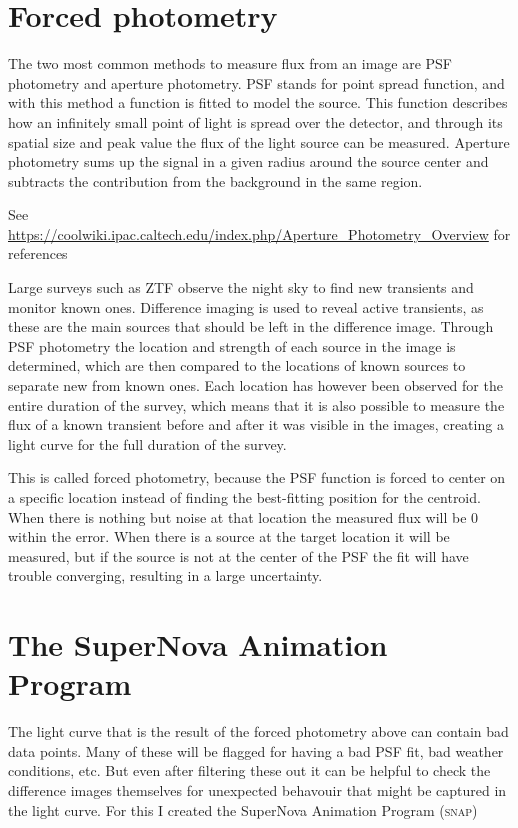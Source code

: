 \documentclass[a4paper,oneside,12pt, class=Latex/Classes/PhDthesisPSnPDF, crop=false]{standalone}
\begin{document}
\section{Forced photometry}
The two most common methods to measure flux from an image are PSF photometry and aperture photometry. PSF stands for point spread function, and with this method a function is fitted to model the source. This function describes how an infinitely small point of light is spread over the detector, and through its spatial size and peak value the flux of the light source can be measured. Aperture photometry sums up the signal in a given radius around the source center and subtracts the contribution from the background in the same region.

\color{red} See \url{https://coolwiki.ipac.caltech.edu/index.php/Aperture_Photometry_Overview} for references \color{black}

Large surveys such as ZTF observe the night sky to find new transients and monitor known ones. Difference imaging is used to reveal active transients, as these are the main sources that should be left in the difference image. Through PSF photometry the location and strength of each source in the image is determined, which are then compared to the locations of known sources to separate new from known ones. Each location has however been observed for the entire duration of the survey, which means that it is also possible to measure the flux of a known transient before and after it was visible in the images, creating a light curve for the full duration of the survey.

This is called forced photometry, because the PSF function is forced to center on a specific location instead of finding the best-fitting position for the centroid. When there is nothing but noise at that location the measured flux will be 0 within the error. When there is a source at the target location it will be measured, but if the source is not at the center of the PSF the fit will have trouble converging, resulting in a large uncertainty.

\section{The SuperNova Animation Program}
The light curve that is the result of the forced photometry above can contain bad data points. Many of these will be flagged for having a bad PSF fit, bad weather conditions, etc. But even after filtering these out it can be helpful to check the difference images themselves for unexpected behavouir that might be captured in the light curve. For this I created the SuperNova Animation Program (\textsc{snap})
\end{document}
